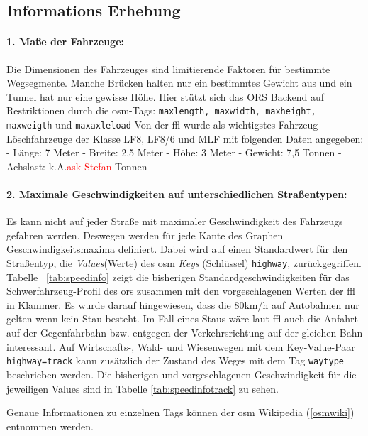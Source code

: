 \documentclass[12pt,a4paper]{article}
\newcommand\todo[1]{\textcolor{red}{#1}}
\begin{document}
\subsection{Informations Erhebung}

\paragraph*{1. Maße der Fahrzeuge:}
\label{frage1}
Die Dimensionen des Fahrzeuges sind limitierende Faktoren für bestimmte Wegsegmente. Manche Brücken halten nur ein bestimmtes Gewicht aus und ein Tunnel hat nur eine gewisse Höhe.
Hier stützt sich das ORS Backend auf Restriktionen durch die \gls{osm}-Tags: \lstinline!maxlength, maxwidth, maxheight, maxweigth! und \lstinline!maxaxleload! Von der \gls{ffl} wurde als wichtigstes Fahrzeug Löschfahrzeuge der Klasse LF8, LF8/6 und MLF mit folgenden Daten angegeben:
- Länge: 7 Meter
- Breite: 2,5 Meter
- Höhe: 3 Meter
- Gewicht: 7,5 Tonnen
- Achslast: k.A.\todo{ask Stefan} Tonnen 

\paragraph*{2. Maximale Geschwindigkeiten auf unterschiedlichen Straßentypen:}
\label{frage2}
Es kann nicht auf jeder Straße mit maximaler Geschwindigkeit des Fahrzeugs gefahren werden. Deswegen werden für jede Kante des Graphen Geschwindigkeitsmaxima definiert.
Dabei wird auf einen Standardwert für den Straßentyp, die \textit{Values}(Werte) des \gls{osm} \textit{Keys} (Schlüssel) \lstinline!highway!, zurückgegriffen.
Tabelle ~\ref{tab:speedinfo} zeigt die bisherigen Standardgeschwindigkeiten für das Schwerfahrzeug-Profil des \gls{ors} zusammen mit den vorgeschlagenen Werten der \gls{ffl} in Klammer.
Es wurde darauf hingewiesen, dass die 80km/h auf Autobahnen nur gelten wenn kein Stau besteht. Im Fall eines Staus wäre laut \gls{ffl} auch die Anfahrt auf der Gegenfahrbahn bzw. entgegen der Verkehrsrichtung auf der gleichen Bahn interessant.
Auf Wirtschafts-, Wald- und Wiesenwegen mit dem Key-Value-Paar  \lstinline!highway=track! kann zusätzlich der Zustand des Weges mit dem Tag \lstinline!waytype! beschrieben werden. Die bisherigen und vorgeschlagenen Geschwindigkeit für die jeweiligen Values sind in Tabelle \ref{tab:speedinfotrack} zu sehen.

Genaue Informationen zu einzelnen Tags können der \gls{osm} Wikipedia (\ref{osmwiki}) entnommen werden.
\end{document}
